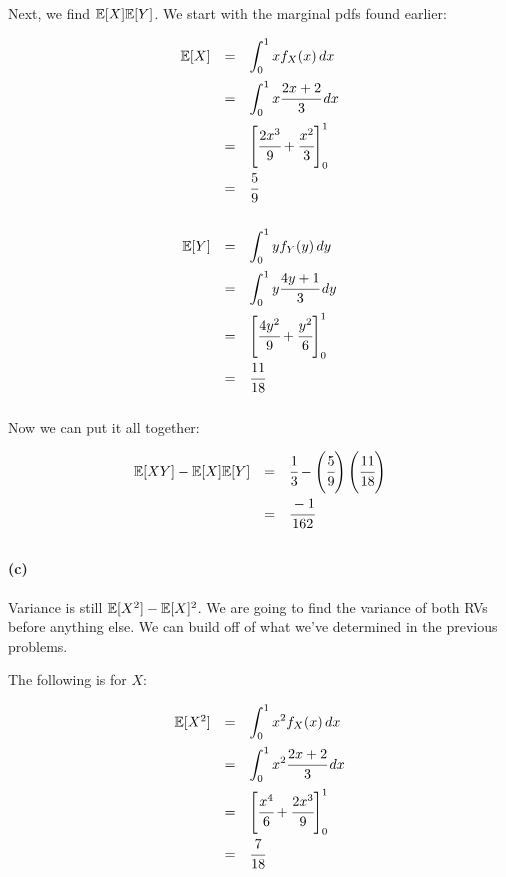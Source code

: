 \documentclass[a4paper]{article}
\begin{document}
Next, we find $\mathbb{E}[X]\mathbb{E}[Y]$. We start with the marginal pdfs found earlier:

\begin{equation}
\begin{array}{rll}
\mathbb{E}[X] & = & \displaystyle\int^1_{0} x f_X(x) \,dx \\[.15in]
& = & \displaystyle\int^1_{0} x \cfrac{2x+2}{3} \,dx \\[.15in]
& = & \left[ \cfrac{2x^3}{9} + \cfrac{x^2}{3} \right]^1_0 \\[.15in]
& = & \cfrac{5}{9} \\[.15in]
\end{array}
\end{equation}

\begin{equation}
\begin{array}{rll}
\mathbb{E}[Y] & = & \displaystyle\int^1_{0} y f_Y(y) \,dy \\[.15in]
& = & \displaystyle\int^1_{0} y \cfrac{4y+1}{3} \,dy \\[.15in]
& = & \left[ \cfrac{4y^2}{9} + \cfrac{y^2}{6} \right]^1_0 \\[.15in]
& = & \cfrac{11}{18} \\[.15in]
\end{array}
\end{equation}

Now we can put it all together:

\begin{equation}
\begin{array}{rll}
\mathbb{E}[XY] - \mathbb{E}[X]\mathbb{E}[Y] & = & \cfrac{1}{3} - \left( \cfrac{5}{9} \right) \left( \cfrac{11}{18} \right) \\[.15in]
& = & \cfrac{-1}{162} \\[.15in]
\end{array}
\end{equation}

\paragraph{(c)}

Variance is still $\mathbb{E}[X^2]-\mathbb{E}[X]^2$. We are going to find the variance of both RVs before anything else. We can build off of what we've determined in the previous problems.

The following is for $X$:

\begin{equation}
\begin{array}{rll}
\mathbb{E}[X^2] & = & \displaystyle\int^1_{0} x^2 f_X(x) \,dx \\[.15in]
& = & \displaystyle\int^1_{0} x^2 \cfrac{2x+2}{3} \,dx \\[.15in]
& = & \left[ \cfrac{x^4}{6} + \cfrac{2x^3}{9} \right]^1_0 \\[.15in]
& = & \cfrac{7}{18} \\[.15in]
\end{array}
\end{equation}
\end{document}
